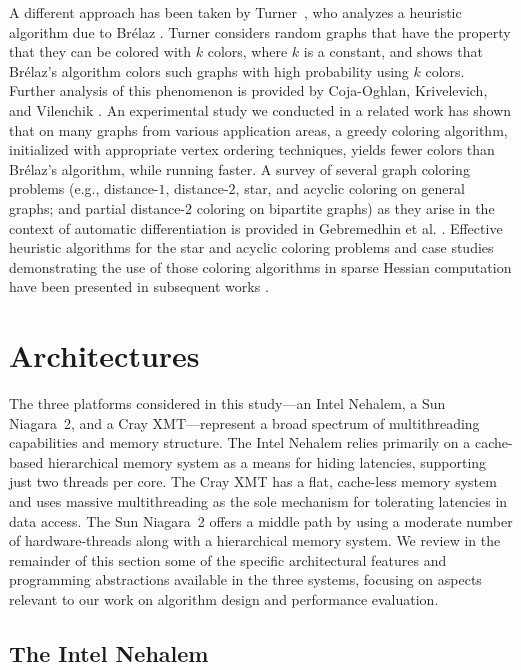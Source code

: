 \documentclass{article}
\begin{document}
A different approach has been taken by Turner~\cite{Turner}, 
who analyzes a heuristic algorithm due to Br{\'{e}}laz \cite{Brelaz}. 
Turner considers random graphs that have the property that they can be colored with $k$ colors, 
where $k$ is a constant, and shows that Br{\'{e}}laz's algorithm colors such graphs  
with high probability using $k$ colors. 
Further analysis of this phenomenon is provided by Coja-Oghlan, Krivelevich, and 
Vilenchik \cite{Oghlan}. 
An experimental study we conducted in a related work \cite{colpack-acm}
has shown that on many graphs from various application areas,  
a greedy coloring algorithm, initialized with appropriate vertex ordering techniques,  
yields fewer colors than Br{\'{e}}laz's algorithm, while running faster.
A survey of several graph coloring problems (e.g., distance-$1$, distance-$2$, star, and 
acyclic coloring on general graphs; and partial distance-$2$ coloring  on bipartite graphs) 
as they arise in the context of automatic differentiation is provided in 
Gebremedhin et al. \cite{GMP05}. 
Effective heuristic algorithms for the star and acyclic coloring problems and case studies
demonstrating the use of those coloring algorithms in sparse Hessian computation have been 
presented in subsequent works  \cite{GTMP07, GPTW09}.  

\section{Architectures}
\label{sec:platforms}

The three platforms considered in this study---an Intel Nehalem, a Sun Niagara~2, 
and a Cray XMT---represent a broad spectrum of multithreading capabilities and memory structure.
The Intel Nehalem relies primarily on a cache-based hierarchical
memory system as a means for hiding latencies, supporting just
two threads per core.  
The Cray XMT has a flat, cache-less memory system and uses
massive multithreading as the sole mechanism for tolerating latencies
in data access.
The Sun Niagara~2 offers a middle path by using a moderate number
of hardware-threads along with a hierarchical memory system. 
We review in the remainder of this section some of the specific architectural features 
and programming abstractions available in the three systems, focusing on aspects 
relevant to our work on algorithm design and performance evaluation.

\subsection{The Intel Nehalem}
\label{sec:nehalem}
\end{document}
